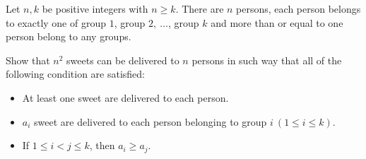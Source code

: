 Let $n, k$ be positive integers with $n \geq k$. There are $n$ persons, each person belongs to exactly one of group $1$, group $2,\ \dots$, group $k$ and more than or equal to one person belong to any  groups.

Show that $n^2$ sweets can be delivered to $n$ persons in such way that all of the following condition are satisfied:

\begin{itemize}
	\item At least one sweet are delivered to each person.
	\item $a_i$ sweet are delivered to each person belonging to group $i\ (1\leq i\leq k).$
	\item If $1 \leq i < j \leq k$, then $a_i \ge a_j.$
\end{itemize}
